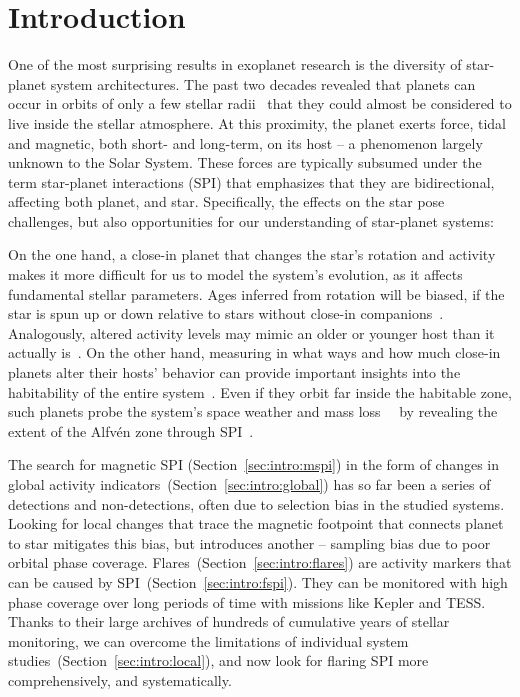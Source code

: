 \documentclass[twocolumn]{aastex631}
\begin{document}
\section{Introduction}
\label{sec:intro}
One of the most surprising results in exoplanet research is the diversity of star-planet system architectures. The past two decades revealed that planets can occur in orbits of only a few stellar radii~\citep[e.g., ][]{sanchis-ojeda2014study} that they could almost be considered to live inside the stellar atmosphere. At this proximity, the planet exerts force, tidal and magnetic, both short- and long-term, on its host -- a phenomenon largely unknown to the Solar System. These forces are typically subsumed under the term star-planet interactions (SPI) that emphasizes that they are bidirectional, affecting both planet, and star. Specifically, the effects on the star pose challenges, but also opportunities for our understanding of star-planet systems:

On the one hand, a close-in planet that changes the star's rotation and activity makes it more difficult for us to model the system's evolution, as it affects fundamental stellar parameters. Ages inferred from rotation will be biased, if the star is spun up or down relative to stars without close-in companions~\citep{tejadaarevalo2021further, brown2014discrepancies, maxted2015comparison}. Analogously, altered activity levels may mimic an older or younger host than it actually is~\citep{ilic2022tidal}. On the other hand, measuring in what ways and how much close-in planets alter their hosts' behavior can provide important insights into the habitability of the entire system~\citep{shkolnik2018signatures}. Even if they orbit far inside the habitable zone, such planets probe the system's space weather and mass loss~~\citep{cohen2011dynamics, cohen2015interaction, hazra2022impact} by revealing the extent of the Alfv\'en zone through SPI~\citep{kavanagh2021planetinduced, chebly2022destination}. %

The search for magnetic SPI (Section~\ref{sec:intro:mspi}) in the form of changes in global activity indicators~(Section~\ref{sec:intro:global}) has so far been a series of detections and non-detections, often due to selection bias in the studied systems. Looking for local changes that trace the magnetic footpoint that connects planet to star mitigates this bias, but introduces another -- sampling bias due to poor orbital phase coverage. Flares~(Section~\ref{sec:intro:flares}) are activity markers that can be caused by SPI~(Section~\ref{sec:intro:fspi}). They can be monitored with high phase coverage over long periods of time with missions like Kepler and TESS. Thanks to their large archives of hundreds of cumulative years of stellar monitoring, we can overcome the limitations of individual system studies~(Section~\ref{sec:intro:local}), and now look for flaring SPI more comprehensively, and systematically.
\end{document}

